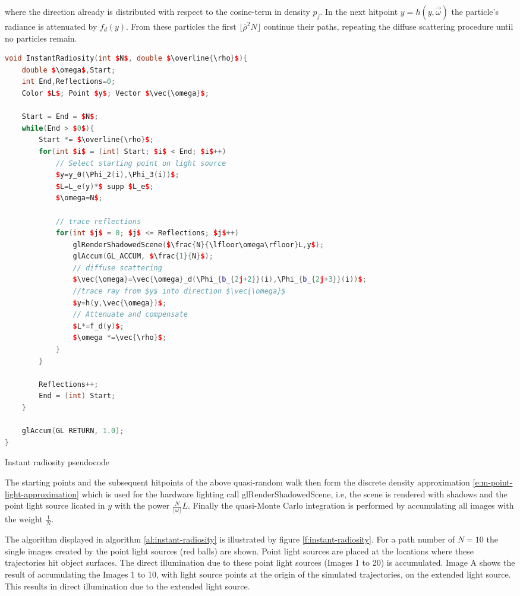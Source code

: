 where the direction already is distributed with respect to the cosine-term in density $p_j$. In the next hitpoint $y=h(y,\vec{\omega})$ the particle's radiance is attenuated by $f_d(y)$. From these particles the first $\lfloor\overline{\rho}^{2}N\rfloor$ continue their paths, repeating the diffuse scattering procedure until no particles remain.

\begin{algorithm}\label{al:instant-radiosity}
\begin{lstlisting}[language=C++,mathescape]
void InstantRadiosity(int $N$, double $\overline{\rho}$){
	double $\omega$,Start;
	int End,Reflections=0; 
	Color $L$; Point $y$; Vector $\vec{\omega}$;
	
	Start = End = $N$; 
	while(End > $0$){
		Start *= $\overline{\rho}$;
		for(int $i$ = (int) Start; $i$ < End; $i$++)
			// Select starting point on light source
			$y=y_0(\Phi_2(i),\Phi_3(i))$;
			$L=L_e(y)*$ supp $L_e$;
			$\omega=N$;
		
			// trace reflections
			for(int $j$ = 0; $j$ <= Reflections; $j$++)
				glRenderShadowedScene($\frac{N}{\lfloor\omega\rfloor}L,y$); 
				glAccum(GL_ACCUM, $\frac{1}{N}$);
				// diffuse scattering
				$\vec{\omega}=\vec{\omega}_d(\Phi_{b_{2j+2}}(i),\Phi_{b_{2j+3}}(i))$;
				//trace ray from $y$ into direction $\vec{\omega}$
				$y=h(y,\vec{\omega})$;
				// Attenuate and compensate
				$L*=f_d(y)$;
				$\omega *=\vec{\rho}$;
			}
		}
    
		Reflections++;
		End = (int) Start;
	}
	
	glAccum(GL RETURN, 1.0);
}                                                                                
\end{lstlisting}	
\caption{Instant radiosity pseudocode}
\end{algorithm}

The starting points and the subsequent hitpoints of the above quasi-random walk then form the discrete density approximation \ref{e:m-point-light-approximation} which is used for the hardware lighting call glRenderShadowedScene, i.e, the scene is rendered with shadows and the point light source licated in $y$ with the power $\frac{N}{\lfloor\omega\rfloor}L$. Finally the quasi-Monte Carlo integration is performed by accumulating all images with the weight $\frac{1}{N}$.

The algorithm displayed in algorithm \ref{al:instant-radiosity} is illustrated by figure \ref{f:instant-radiosity}. For a path number of $N=10$ the single images created by the point light sources (red balls) are shown. Point light sources are placed at the locations where these trajectories hit object surfaces. The direct illumination due to these point light sources (Images 1 to 20) is accumulated. Image A shows the result of accumulating the Images 1 to 10, with light source points at the origin of the simulated trajectories, on the extended light source. This results in direct illumination due to the extended light source.

